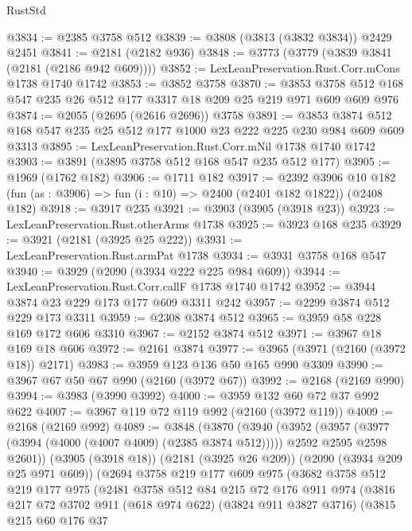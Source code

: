\begin{lexlean}{RustStd}
\begin{coremodule}
@3834 := @2385 @3758 @512
@3839 := @3808 (@3813 (@3832 @3834)) @2429 @2451
@3841 := @2181 (@2182 @936)
@3848 := @3773 (@3779 (@3839 @3841 (@2181 (@2186 @942 @609))))
@3852 := LexLeanPreservation.Rust.Corr.mCons @1738 @1740 @1742
@3853 := @3852 @3758
@3870 := @3853 @3758 @512 @168 @547 @235 @26 @512 @177 @3317 @18 @209 @25 @219 @971 @609 @609 @976
@3874 := @2055 (@2695 (@2616 @2696)) @3758
@3891 := @3853 @3874 @512 @168 @547 @235 @25 @512 @177 @1000 @23 @222 @225 @230 @984 @609 @609 @3313
@3895 := LexLeanPreservation.Rust.Corr.mNil @1738 @1740 @1742
@3903 := @3891 (@3895 @3758 @512 @168 @547 @235 @512 @177)
@3905 := @1969 (@1762 @182)
@3906 := @1711 @182
@3917 := @2392
    @3906
    @10
    @182
    (fun (as : @3906) => fun (i : @10) => @2400 (@2401 @182 @1822))
    (@2408 @182)
@3918 := @3917 @235
@3921 := @3903 (@3905 (@3918 @23))
@3923 := LexLeanPreservation.Rust.otherArms @1738
@3925 := @3923 @168 @235
@3929 := @3921 (@2181 (@3925 @25 @222))
@3931 := LexLeanPreservation.Rust.armPat @1738
@3934 := @3931 @3758 @168 @547
@3940 := @3929 (@2090 (@3934 @222 @225 @984 @609))
@3944 := LexLeanPreservation.Rust.Corr.callF @1738 @1740 @1742
@3952 := @3944 @3874 @23 @229 @173 @177 @609 @3311 @242
@3957 := @2299 @3874 @512 @229 @173 @3311
@3959 := @2308 @3874 @512
@3965 := @3959 @58 @228 @169 @172 @606 @3310
@3967 := @2152 @3874 @512
@3971 := @3967 @18 @169 @18 @606
@3972 := @2161 @3874
@3977 := @3965 (@3971 (@2160 (@3972 @18)) @2171)
@3983 := @3959 @123 @136 @50 @165 @990 @3309
@3990 := @3967 @67 @50 @67 @990 (@2160 (@3972 @67))
@3992 := @2168 (@2169 @990)
@3994 := @3983 (@3990 @3992)
@4000 := @3959 @132 @60 @72 @37 @992 @622
@4007 := @3967 @119 @72 @119 @992 (@2160 (@3972 @119))
@4009 := @2168 (@2169 @992)
@4089 := @3848
    (@3870
      (@3940
        (@3952
          (@3957 (@3977 (@3994 (@4000 (@4007 @4009) (@2385 @3874 @512)))))
          @2592
          @2595
          @2598
          @2601))
      (@3905 (@3918 @18))
      (@2181 (@3925 @26 @209))
      (@2090 (@3934 @209 @25 @971 @609))
      (@2694
        @3758
        @219
        @177
        @609
        @975
        (@3682
          @3758
          @512
          @219
          @177
          @975
          (@2481
            @3758
            @512
            @84
            @215
            @72
            @176
            @911
            @974
            (@3816
              @217
              @72
              @3702
              @911
              (@618 @974 @622)
              (@3824 @911 @3827 @3716)
              (@3815
                @215
                @60
                @176
                @37

\end{coremodule}
\end{lexlean}
